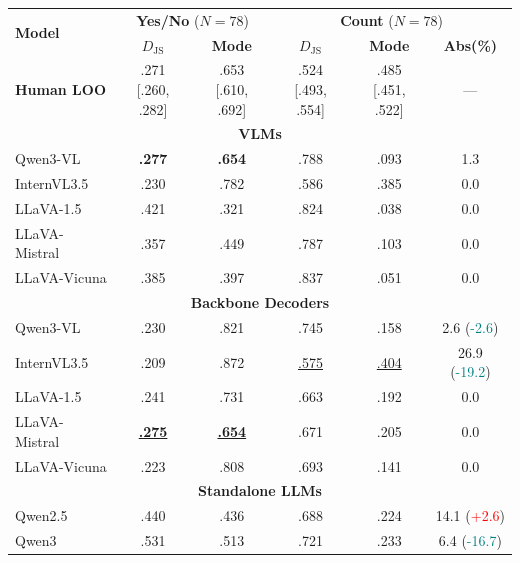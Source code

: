 \begin{table}[t]
\centering
\small
\setlength{\tabcolsep}{2.2pt}
\renewcommand{\arraystretch}{0.95}

\begin{tabular}{lcc@{\hspace{6pt}}ccc}
\toprule
\multirow{2}{*}{\textbf{Model}} &
\multicolumn{2}{c}{\textbf{Yes/No} ($N{=}78$)} &
\multicolumn{3}{c}{\textbf{Count} ($N{=}78$)} \\
\cmidrule(lr){2-3}\cmidrule(lr){4-6}
& \textbf{$D_{\mathrm{JS}}$} & \textbf{Mode} & \textbf{$D_{\mathrm{JS}}$} & \textbf{Mode} & \textbf{Abs(\%)} \\
\midrule
\textbf{Human LOO} & \makecell[c]{.271 \\ {\scriptsize [.260, .282]}} & \makecell[c]{.653 \\ {\scriptsize [.610, .692]}} & \makecell[c]{.524 \\ {\scriptsize [.493, .554]}} & \makecell[c]{.485 \\ {\scriptsize [.451, .522]}} & --- \\
\midrule
\multicolumn{6}{c}{\textbf{VLMs}} \\
\midrule
Qwen3-VL & \textbf{.277} & \textbf{.654} & .788 & .093 & 1.3 \\
InternVL3.5 & .230 & .782 & .586 & .385 & 0.0 \\
LLaVA-1.5 & .421 & .321 & .824 & .038 & 0.0 \\
LLaVA-Mistral & .357 & .449 & .787 & .103 & 0.0 \\
LLaVA-Vicuna & .385 & .397 & .837 & .051 & 0.0 \\
\midrule
\multicolumn{6}{c}{\textbf{Backbone Decoders}} \\
\midrule
Qwen3-VL & .230 & .821 & .745 & .158 & 2.6 {\scriptsize (\textcolor{teal}{-2.6})} \\
InternVL3.5 & .209 & .872 & \underline{.575} & \underline{.404} & 26.9 {\scriptsize (\textcolor{teal}{-19.2})} \\
LLaVA-1.5 & .241 & .731 & .663 & .192 & 0.0 \\
LLaVA-Mistral & \underline{\textbf{.275}} & \underline{\textbf{.654}} & .671 & .205 & 0.0 \\
LLaVA-Vicuna & .223 & .808 & .693 & .141 & 0.0 \\
\midrule
\multicolumn{6}{c}{\textbf{Standalone LLMs}} \\
\midrule
Qwen2.5 & .440 & .436 & .688 & .224 & 14.1 {\scriptsize (\textcolor{red}{+2.6})} \\
Qwen3 & .531 & .513 & .721 & .233 & 6.4 {\scriptsize (\textcolor{teal}{-16.7})} \\

\end{tabular}
\end{table}
